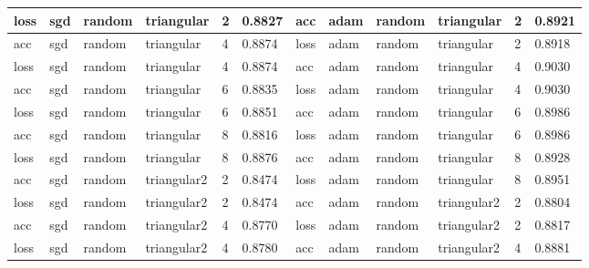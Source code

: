 \begin{table}[H]
\begin{adjustbox}{width=1\textwidth}
\begin{tabular}{|l|l|l|l|l|l||l|l|l|l|l|l|}
loss          & sgd          & random        & triangular       & 2             & 0.8827            & acc           & adam         & random        & triangular       & 2             & 0.8921            \\ \hline
acc           & sgd          & random        & triangular       & 4             & 0.8874            & loss          & adam         & random        & triangular       & 2             & 0.8918            \\ \hline
loss          & sgd          & random        & triangular       & 4             & 0.8874            & acc           & adam         & random        & triangular       & 4             & 0.9030            \\ \hline
acc           & sgd          & random        & triangular       & 6             & 0.8835            & loss          & adam         & random        & triangular       & 4             & 0.9030            \\ \hline
loss          & sgd          & random        & triangular       & 6             & 0.8851            & acc           & adam         & random        & triangular       & 6             & 0.8986            \\ \hline
acc           & sgd          & random        & triangular       & 8             & 0.8816            & loss          & adam         & random        & triangular       & 6             & 0.8986            \\ \hline
loss          & sgd          & random        & triangular       & 8             & 0.8876            & acc           & adam         & random        & triangular       & 8             & 0.8928            \\ \hline
acc           & sgd          & random        & triangular2      & 2             & 0.8474            & loss          & adam         & random        & triangular       & 8             & 0.8951            \\ \hline
loss          & sgd          & random        & triangular2      & 2             & 0.8474            & acc           & adam         & random        & triangular2      & 2             & 0.8804            \\ \hline
acc           & sgd          & random        & triangular2      & 4             & 0.8770            & loss          & adam         & random        & triangular2      & 2             & 0.8817            \\ \hline
loss          & sgd          & random        & triangular2      & 4             & 0.8780            & acc           & adam         & random        & triangular2      & 4             & 0.8881            \\ \hline

\end{tabular}
\end{adjustbox}
\end{table}
